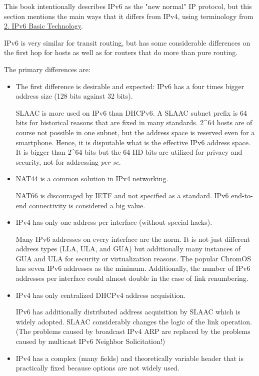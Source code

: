 \documentclass[
]{article}
\begin{document}
This book intentionally describes IPv6 as the "new normal" IP protocol,
but this section mentions the main ways that it differs from IPv4, using
terminology from \hyperref[ipv6-basic-technology]{2. IPv6 Basic
Technology}.

IPv6 is very similar for transit routing, but has some considerable
differences on the first hop for hosts as well as for routers that do
more than pure routing.

The primary differences are:

\begin{itemize}
\item
  The first difference is desirable and expected: IPv6 has a four times
  bigger address size (128 bits against 32 bits).

  SLAAC is more used on IPv6 than DHCPv6. A SLAAC subnet prefix is 64
  bits for historical reasons that are fixed in many standards. 2\^{}64
  hosts are of course not possible in one subnet, but the address space
  is reserved even for a smartphone. Hence, it is disputable what is the
  effective IPv6 address space. It is bigger than 2\^{}64 bits but the
  64 IID bits are utilized for privacy and security, not for addressing
  \emph{per se}.
\item
  NAT44 is a common solution in IPv4 networking.

  NAT66 is discouraged by IETF and not specified as a standard. IPv6
  end-to-end connectivity is considered a big value.
\item
  IPv4 has only one address per interface (without special hacks).

  Many IPv6 addresses on every interface are the norm. It is not just
  different address types (LLA, ULA, and GUA) but additionally many
  instances of GUA and ULA for security or virtualization reasons. The
  popular ChromOS has seven IPv6 addresses as the minimum. Additionally,
  the number of IPv6 addresses per interface could almost double in the
  case of link renumbering.
\item
  IPv4 has only centralized DHCPv4 address acquisition.

  IPv6 has additionally distributed address acquisition by SLAAC which
  is widely adopted. SLAAC considerably changes the logic of the link
  operation. (The problems caused by broadcast IPv4 ARP are replaced by
  the problems caused by multicast IPv6 Neighbor Solicitation!)
\item
  IPv4 has a complex (many fields) and theoretically variable header
  that is practically fixed because options are not widely used.


\end{itemize}
\end{document}
